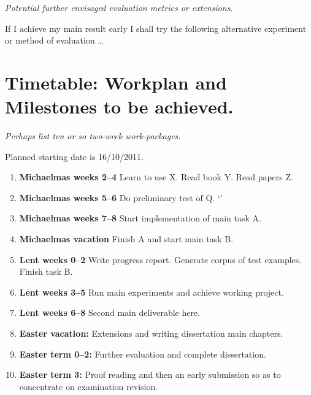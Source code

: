 \documentclass[12pt,a4paper,twoside]{article}
\begin{document}
{\em Potential further envisaged evaluation metrics or extensions.}

If I achieve my main result early I shall try the following
alternative experiment or method of evaluation \ldots


\section*{Timetable: Workplan and Milestones to be achieved.}


{\em Perhaps list ten or so  two-week work-packages.}

Planned starting date is 16/10/2011.

\begin{enumerate}

\item {\bf Michaelmas weeks 2--4} Learn to use X. Read book Y. Read papers Z.

\item {\bf Michaelmas weeks 5--6} Do preliminary test of Q.
`'
\item {\bf Michaelmas weeks 7--8} Start implementation of main task A.

\item {\bf Michaelmas vacation} Finish A and start main task B.

\item {\bf Lent weeks 0--2} Write progress report. Generate corpus of
  test examples. Finish task B.

\item {\bf Lent weeks 3--5} Run main experiments and achieve working project.

\item {\bf Lent weeks 6--8} Second main deliverable here.

\item {\bf Easter vacation:} Extensions and writing dissertation main
  chapters.

\item {\bf Easter term 0--2:}  Further evaluation and complete dissertation.

\item {\bf Easter term 3:} Proof reading and then an early submission
  so as to concentrate on examination revision.

\end{enumerate}
\end{document}
